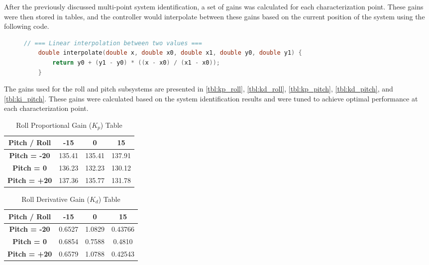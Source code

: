 After the previously discussed multi-point system identification, a set of gains was calculated for each characterization point. These gains were then stored in tables, and the controller would interpolate between these gains based on the current position of the system using the following code.

\begin{figure}[h!]
    \centering
    \begin{lstlisting}[language=C++, caption={Linear Interpolation for Gain Scheduling}, label={lst:gain_interpolation}]
    // === Linear interpolation between two values ===
    double interpolate(double x, double x0, double x1, double y0, double y1) {
        return y0 + (y1 - y0) * ((x - x0) / (x1 - x0));
    }
    \end{lstlisting}
    \end{figure}

The gains used for the roll and pitch subsystems are presented in \autoref{tbl:kp_roll}, \autoref{tbl:kd_roll}, \autoref{tbl:kp_pitch}, \autoref{tbl:kd_pitch}, and \autoref{tbl:ki_pitch}. These gains were calculated based on the system identification results and were tuned to achieve optimal performance at each characterization point.

\begin{table}[H]
    \centering
    \caption{Roll Proportional Gain ($K_p$) Table}
    \label{tbl:kp_roll}
    \begin{tabular}{cccc} %
    \toprule %
    \textbf{Pitch / Roll} & \textbf{-15} & \textbf{0} & \textbf{15} \\
    \midrule %
    \textbf{Pitch = -20} & 135.41 & 135.41 & 137.91 \\
    \textbf{Pitch = 0}   & 136.23 & 132.23 & 130.12 \\
    \textbf{Pitch = +20} & 137.36 & 135.77 & 131.78 \\
    \bottomrule %
    \end{tabular}
    \end{table}
    
    \begin{table}[H]
    \centering
    \caption{Roll Derivative Gain ($K_d$) Table}
    \label{tbl:kd_roll}
    \begin{tabular}{cccc} %
    \toprule %
    \textbf{Pitch / Roll} & \textbf{-15} & \textbf{0} & \textbf{15} \\
    \midrule %
    \textbf{Pitch = -20} & 0.6527 & 1.0829 & 0.43766 \\
    \textbf{Pitch = 0}   & 0.6854 & 0.7588 & 0.4810 \\
    \textbf{Pitch = +20} & 0.6579 & 1.0788 & 0.42543 \\
    \bottomrule %
    \end{tabular}
    \end{table}
    
